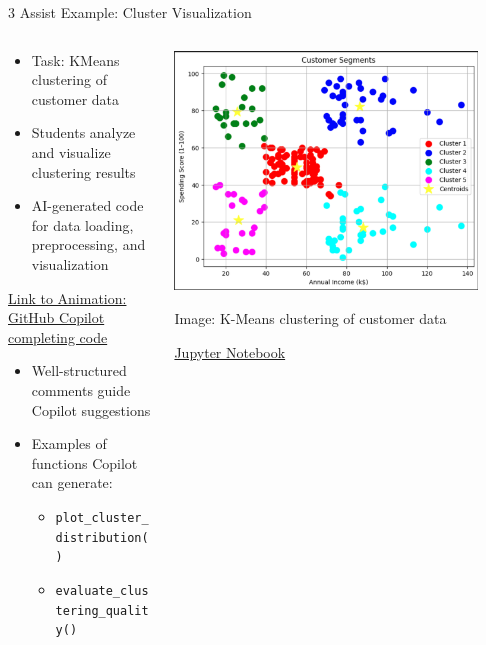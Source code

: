 \documentclass[xcolor={dvipsnames,table}, aspectratio=169]{beamer}
\begin{document}
\begin{frame}{3 Assist Example: Cluster Visualization}
  \begin{columns}
    \begin{column}{0.6\textwidth}
      \begin{itemize}
        \item Task: KMeans clustering of customer data
        \item Students analyze and visualize clustering results
        \item AI-generated code for data loading, preprocessing, and visualization
      \end{itemize}
      \vspace{0.5em}
      \href{https://github.com/neu-ece-esl/ai-prog-workshop/tree/main/3-assist}{Link to Animation: GitHub Copilot completing code}
      \vspace{0.5em}
      \begin{itemize}
        \item Well-structured comments guide Copilot suggestions
        \item Examples of functions Copilot can generate:
        \begin{itemize}
          \item \texttt{plot\_cluster\_distribution()}
          \item \texttt{evaluate\_clustering\_quality()}
        \end{itemize}
      \end{itemize}
    \end{column}
    
    \begin{column}{0.4\textwidth}
      \includegraphics[width=0.9\textwidth]{../3-assist/Cluster.jpeg}
      \tiny\centerline{Image: K-Means clustering of customer data}
      \tiny\centerline{\href{https://github.com/neu-ece-esl/ai-prog-workshop/blob/main/3-assist/KMeans_Clustering.ipynb}{Jupyter Notebook}}


\end{column}
\end{columns}
\end{frame}
\end{document}
